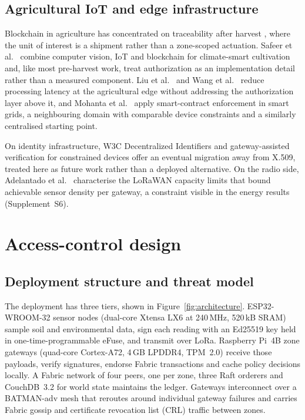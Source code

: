 \documentclass[a4paper,fleqn]{cas-dc}
\begin{document}
\subsection{Agricultural IoT and edge infrastructure}
\label{subsec:rw_agri}

Blockchain in agriculture has concentrated on traceability after harvest
\cite{tian2017traceability,lin2018blockchain,bandara2021modeling}, where the
unit of interest is a shipment rather than a zone-scoped actuation. Safeer et
al.\ \cite{safeer2025agrifarming} combine computer vision, IoT and blockchain
for climate-smart cultivation and, like most pre-harvest work, treat
authorization as an implementation detail rather than a measured component.
Liu et al.\ \cite{liu2019edge} and Wang et al.\ \cite{wang2021edge} reduce
processing latency at the agricultural edge without addressing the
authorization layer above it, and Mohanta et al.\ \cite{mohanta2025smartgrid}
apply smart-contract enforcement in smart grids, a neighbouring domain with
comparable device constraints and a similarly centralised starting point.

On identity infrastructure, W3C Decentralized Identifiers
\cite{w3c_did_core} and gateway-assisted verification for constrained devices
\cite{ferdous2019ssi,tara2023decentralized} offer an eventual migration away
from X.509, treated here as future work rather than a deployed alternative.
On the radio side, Adelantado et al.\ \cite{adelantado2017understanding}
characterise the LoRaWAN capacity limits that bound achievable sensor density
per gateway, a constraint visible in the energy results (Supplement~S6).

\section{Access-control design}
\label{sec:design}

\subsection{Deployment structure and threat model}
\label{subsec:threat}

The deployment has three tiers, shown in Figure~\ref{fig:architecture}.
ESP32-WROOM-32 sensor nodes (dual-core Xtensa LX6 at 240\,MHz, 520\,kB SRAM)
sample soil and environmental data, sign each reading with an Ed25519 key
held in one-time-programmable eFuse, and transmit over LoRa. Raspberry Pi~4B
zone gateways (quad-core Cortex-A72, 4\,GB LPDDR4, TPM~2.0) receive those
payloads, verify signatures, endorse Fabric transactions and cache policy
decisions locally. A Fabric network of four peers, one per zone, three Raft
orderers and CouchDB~3.2 for world state maintains the ledger. Gateways
interconnect over a BATMAN-adv mesh \cite{batman2010} that reroutes around
individual gateway failures and carries Fabric gossip and certificate
revocation list (CRL) traffic between zones.
\end{document}
